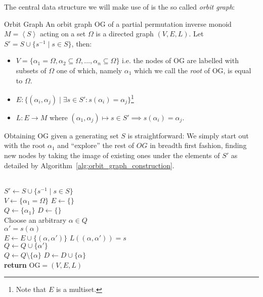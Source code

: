 The central data structure we will make use of is the so called \textit{orbit
graph}:

\begin{defn}{Orbit Graph}
  An orbit graph $\mathrm{OG}$ of a partial permutation inverse monoid $M =
  \left<S\right>$ acting on a set $\Omega$ is a directed graph $(V, E, L)$.
  Let $S' = S \cup \{s^{-1} \mid s \in S\}$, then:
  \begin{itemize}
    \item $V = \{\alpha_1 = \Omega, \alpha_2 \subseteq
      \Omega, \dots, \alpha_n \subseteq \Omega\}$ i.e. the nodes of
      $\mathrm{OG}$ are labelled with subsets of $\Omega$ one of which,
      namely $\alpha_1$ which we call the \textit{root} of
      $\mathrm{OG}$, is equal to $\Omega$.

    \item $E: \{(\alpha_i,\alpha_j) \mid \exists s \in S': s(\alpha_i) =
                \alpha_j\}$\footnote{Note that $E$ is a multiset.}

    \item $L: E \rightarrow M$ where $(\alpha_1,\alpha_j) \mapsto s \in S'
          \implies s(\alpha_i) = \alpha_j$.
  \end{itemize}
\end{defn}
%
Obtaining $\mathrm{OG}$ given a generating set $S$ is straightforward: We
simply start out with the root $\alpha_1$ and ``explore'' the rest of $OG$ in
breadth first fashion, finding new nodes by taking the image of existing ones
under the elements of $S'$ as detailed by
Algorithm~\ref{alg:orbit_graph_construction}.

\begin{algorithm}
  \caption{Construct orbit graph.}
  \label{alg:orbit_graph_construction}
  \begin{algorithmic}[1]
       \\
       \State $S' \gets S \cup \{s^{-1} \mid s \in S\}$
       \\
       \State $V \gets \{\alpha_1 = \Omega\}$
       \State $E \gets \{\}$
       \\
       \State $Q \gets \{\alpha_1\}$
       \State $D \gets \{\}$
       \\
         \State Choose an arbitrary $\alpha \in Q$
         \\
            \State $\alpha' = s(\alpha)$
            \\
            \State $E \gets E \cup \{(\alpha, \alpha')\}$
            \State $L((\alpha, \alpha')) = s$
            \\
              \State $Q \gets Q \cup \{\alpha'\}$
            \EndIf
         \EndFor
         \\
         \State $Q \gets Q \setminus \{\alpha\}$
         \State $D \gets D \cup \{\alpha\}$
       \EndWhile
       \\
       \State \textbf{return} $\mathrm{OG} = (V, E, L)$
    \EndProcedure
  \end{algorithmic}
\end{algorithm}

